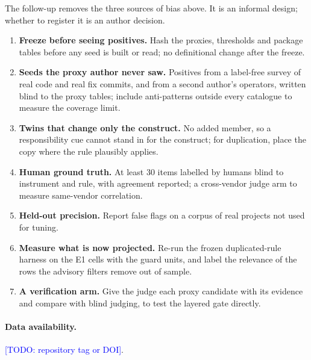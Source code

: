 \documentclass[10pt,a4paper]{article}
\newcommand{\todo}[1]{\textcolor{blue}{[TODO: #1]}}
\begin{document}
The follow-up removes the three sources of bias above. It is an informal design; whether to register it is an author
decision.
\begin{enumerate}[leftmargin=*]
  \item \textbf{Freeze before seeing positives.} Hash the proxies, thresholds and package tables before any seed is
        built or read; no definitional change after the freeze.
  \item \textbf{Seeds the proxy author never saw.} Positives from a label-free survey of real code and real fix
        commits, and from a second author's operators, written blind to the proxy tables; include anti-patterns
        outside every catalogue to measure the coverage limit.
  \item \textbf{Twins that change only the construct.} No added member, so a responsibility cue cannot stand in for
        the construct; for duplication, place the copy where the rule plausibly applies.
  \item \textbf{Human ground truth.} At least 30 items labelled by humans blind to instrument and rule, with
        agreement reported; a cross-vendor judge arm to measure same-vendor correlation.
  \item \textbf{Held-out precision.} Report false flags on a corpus of real projects not used for tuning.
  \item \textbf{Measure what is now projected.} Re-run the frozen duplicated-rule harness on the E1 cells with the
        guard units, and label the relevance of the rows the advisory filters remove out of sample.
  \item \textbf{A verification arm.} Give the judge each proxy candidate with its evidence and compare with blind
        judging, to test the layered gate directly.
\end{enumerate}

\paragraph{Data availability.} \todo{repository tag or DOI}.



\end{document}

